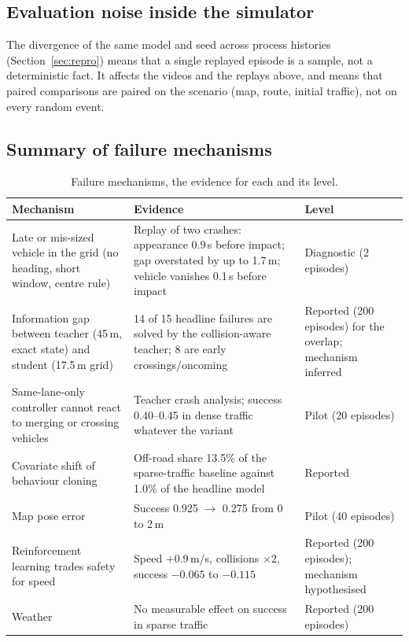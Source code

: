 \subsection{Evaluation noise inside the simulator}
The divergence of the same model and seed across process histories (Section~\ref{sec:repro}) means that a single replayed episode is a sample, not a deterministic fact. It affects the videos and the replays above, and means that paired comparisons are paired on the scenario (map, route, initial traffic), not on every random event.

\subsection{Summary of failure mechanisms}
\begin{table}[H]\centering\small
\caption{Failure mechanisms, the evidence for each and its level.}\label{tab:mechanisms}
\begin{tabularx}{\textwidth}{@{}>{\raggedright\arraybackslash}p{4.4cm}X>{\raggedright\arraybackslash}p{2.6cm}@{}}\toprule
Mechanism & Evidence & Level\\\midrule
Late or mis-sized vehicle in the grid (no heading, short window, centre rule) & Replay of two crashes: appearance 0.9\,s before impact; gap overstated by up to 1.7\,m; vehicle vanishes 0.1\,s before impact & Diagnostic (2 episodes)\\
Information gap between teacher (45\,m, exact state) and student (17.5\,m grid) & 14 of 15 headline failures are solved by the collision-aware teacher; 8 are early crossings/oncoming & Reported (200 episodes) for the overlap; mechanism inferred\\
Same-lane-only controller cannot react to merging or crossing vehicles & Teacher crash analysis; success 0.40--0.45 in dense traffic whatever the variant & Pilot (20 episodes)\\
Covariate shift of behaviour cloning & Off-road share 13.5\% of the sparse-traffic baseline against 1.0\% of the headline model & Reported\\
Map pose error & Success 0.925 $\to$ 0.275 from 0 to 2\,m & Pilot (40 episodes)\\
Reinforcement learning trades safety for speed & Speed +0.9\,m/s, collisions $\times2$, success $-0.065$ to $-0.115$ & Reported (200 episodes); mechanism hypothesised\\
Weather & No measurable effect on success in sparse traffic & Reported (200 episodes)\\\bottomrule
\end{tabularx}
\end{table}
